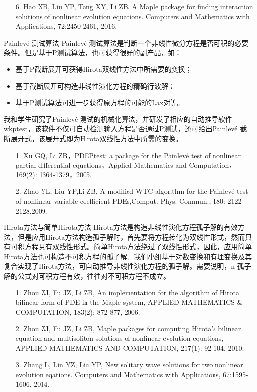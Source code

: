 \documentclass{beamer}
\begin{document}
\begin{frame}
  \begin{itemize}
    \item[6.] Hao XB, Liu YP, Tang XY, Li ZB. A Maple package for finding interaction solutions of nonlinear evolution equations. Computers and Mathematics with Applications, 72:2450-2461, 2016.
  \end{itemize}
 \end{frame}

\begin{frame}{Painlev\'e 测试算法}
Painlev\'e 测试算法是判断一个非线性微分方程是否可积的必要条件。但是基于P测试算法，也可获得很好的副产品，如：
\begin{itemize}
  \item 基于P截断展开可获得Hirota双线性方法中所需要的变换；
  \item 基于截断展开可构造非线性演化方程的精确行波解； 
  \item 基于P测试算法可进一步获得原方程的可能的Lax对等。
\end{itemize} 
我和学生研究了Painlev\'e 测试的机械化算法，并研发了相应的自动推导软件wkptest，该软件不仅可自动检测输入方程是否通过P测试，还可给出Painlev\'e 截断展开式，该展开式即为Hirota双线性方法中所需的变换。
\begin{itemize}
  \item[1.] Xu GQ, Li ZB，PDEPtest: a package for the Painlevé test of nonlinear partial differential equations，Applied Mathematics and Computation，169(2): 1364-1379，2005.
  \item[2.]Zhao YL, Liu YP,Li ZB,  A modified WTC algorithm for the Painlevé test of nonlinear variable coefficient PDEs,Comput. Phys. Commun., 180: 2122-2128,2009.   
\end{itemize}       
\end{frame}

\begin{frame}{Hirota方法与简单Hirota方法}
Hirota方法是构造非线性演化方程孤子解的有效方法，但是应用Hirota方法构造孤子解时，首先要将方程转化为双线性形式，然而只有可积方程只有双线性形式。简单Hirota方法绕过了双线性形式，因此，应用简单Hirota方法也可构造不可积方程的孤子解。我们小组基于对数变换和有理变换及其复合实现了Hirota方法，可自动推导非线性演化方程的孤子解。需要说明，n-孤子解的公式对可积方程有效，往往对不可积方程不成立。
 \begin{itemize}
  \item[1.] Zhou ZJ, Fu JZ, Li ZB, An implementation for the algorithm of Hirota bilinear form of PDE in the Maple system, APPLIED MATHEMATICS \& COMPUTATION, 183(2): 872-877, 2006.
  \item[2.] Zhou ZJ, Fu JZ, Li ZB, Maple packages for computing Hirota's bilinear equation and multisoliton solutions of nonlinear evolution equations, APPLIED MATHEMATICS AND COMPUTATION, 217(1): 92-104, 2010.
  \item[3.] Zhang L, Lin YZ, Liu YP, New solitary wave solutions for two nonlinear evolution eqations. Computers and Mathematics with Applications, 67:1595-1606, 2014.
 \end{itemize}
\end{frame}
\end{document}
